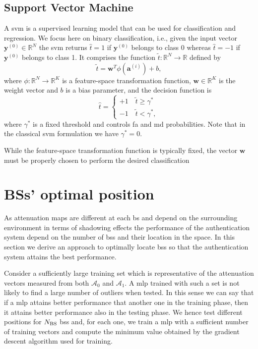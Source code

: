 \documentclass[twocolumns]{IEEEtran}
\begin{document}
\subsection{Support Vector Machine}\label{sec:svm}
A \ac{svm} \cite{Bishop2006} is a supervised learning model that can be used for classification and regression. We focus here on binary classification, i.e., given the input vector $\bm{y}^{(0)} \in \mathbb{R}^N$ the \ac{svm} returns $\hat{t} = 1$ if $\bm{y}^{(0)}$ belongs to class 0 whereas $\hat{t}=-1$ if $\bm{y}^{(0)}$ belongs to class 1. It comprises the function $\tilde{t}: \mathbb{R}^N \to \mathbb{R}$ defined by
\begin{equation}
\label{eq:svm}
\tilde{t} = \mathbf{w}^T \phi (\mathbf{a}^{(i)}) + b,
\end{equation}
where $\phi: \mathbb{R}^N \to \mathbb{R}^K$ is a feature-space transformation function, $\mathbf{w} \in \mathbb{R}^K$ is the weight vector and $b$ is a bias parameter, and the decision function is
\begin{equation}
\label{eq:cases}
\hat{t} = 
\begin{cases}
+1 \quad \tilde{t}  \geq \gamma^* \\
-1 \quad \tilde{t}  < \gamma^*,
\end{cases}		
\end{equation} 
where $\gamma^*$ is a fixed threshold and controls \ac{fa} and \ac{md} probabilities. Note that in the classical \ac{svm} formulation we have $\gamma^* = 0$.

While the feature-space transformation function is typically fixed, the vector $\mathbf{w}$ must be properly chosen to perform the desired classification

\section{BSs' optimal position}\label{sec:bsPos}
As attenuation maps are different at each \ac{bs} and depend on the surrounding environment in terms of shadowing effects the performance of the authentication system depend on the number of \acp{bs} and their location in the space. In this section we derive an approach to optimally locate \acp{bs} so that the authentication system attains the best performance. 

Consider a sufficiently large training set which is representative of the attenuation vectors measured from both $\mathcal{A}_0$ and $\mathcal{A}_1$. A \ac{mlp} trained with such a set is not likely to find a large number of outliers when tested. In this sense we can say that if a \ac{mlp} attains better performance that another one in the training phase, then it attains better performance also in the testing phase. We hence test different positions for $N_{\rm BS}$ \acp{bs} and, for each one, we train a \ac{mlp} with a sufficient number of training vectors and compute the minimum value obtained by the gradient descent algorithm used for training.
\end{document}

